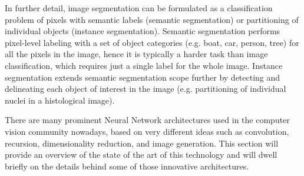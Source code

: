 \documentclass[12pt,a4paper]{report}
\begin{document}
In further detail, image segmentation can be formulated as a classification problem of pixels with semantic labels (semantic segmentation) or partitioning of individual objects (instance segmentation). Semantic segmentation performs pixel-level labeling with a set of object categories (e.g. boat, car, person, tree) for all the pixels in the image, hence it is typically a harder task than image classification, which requires just a single label for the whole image. Instance segmentation extends semantic segmentation scope further by detecting and delineating each object of interest in the image (e.g. partitioning of individual nuclei in a histological image).

There are many prominent Neural Network architectures used in the computer vision community nowadays, based on very different ideas such as convolution, recursion, dimensionality reduction, and image generation. This section will provide an overview of the state of the art of this technology and will dwell briefly on the details behind some of those innovative architectures.
\end{document}

